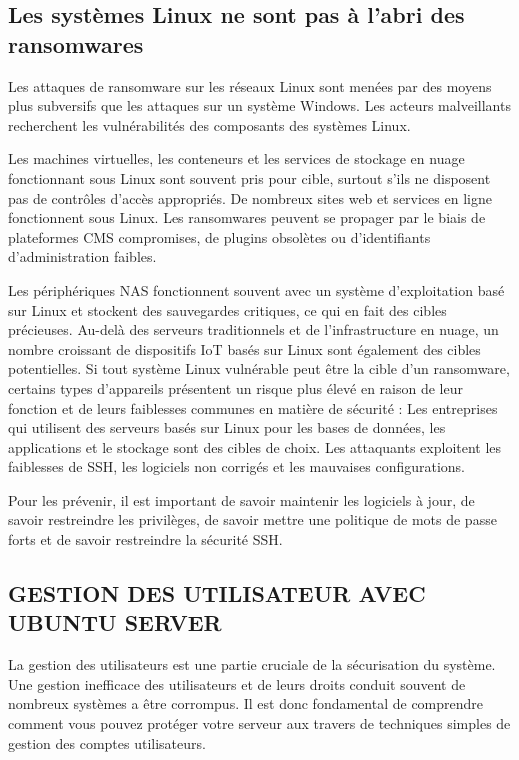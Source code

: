\subsection*{Les systèmes Linux ne sont pas à l'abri des ransomwares}
{}
\noindent Les attaques de ransomware sur les réseaux Linux sont menées par des moyens plus subversifs que les
attaques sur un système Windows. Les acteurs malveillants recherchent les vulnérabilités des
composants des systèmes Linux.

\noindent Les machines virtuelles, les conteneurs et les services de stockage en nuage fonctionnant sous Linux
sont souvent pris pour cible, surtout s'ils ne disposent pas de contrôles d'accès appropriés.
De nombreux sites web et services en ligne fonctionnent sous Linux. Les ransomwares peuvent se
propager par le biais de plateformes CMS compromises, de plugins obsolètes ou d'identifiants
d'administration faibles.

\noindent  Les périphériques NAS fonctionnent souvent avec un système d'exploitation basé sur Linux et stockent
des sauvegardes critiques, ce qui en fait des cibles précieuses.
Au-delà des serveurs traditionnels et de l'infrastructure en nuage, un nombre croissant de dispositifs IoT
basés sur Linux sont également des cibles potentielles.
Si tout système Linux vulnérable peut être la cible d'un ransomware, certains types d'appareils
présentent un risque plus élevé en raison de leur fonction et de leurs faiblesses communes en matière
de sécurité :
\noindent Les entreprises qui utilisent des serveurs basés sur Linux pour les bases de données, les applications et
le stockage sont des cibles de choix. Les attaquants exploitent les faiblesses de SSH, les logiciels non
corrigés et les mauvaises configurations.

\noindent Pour les prévenir, il est important de savoir maintenir les logiciels à jour, de savoir restreindre les
privilèges, de savoir mettre une politique de mots de passe forts et de savoir restreindre la sécurité SSH.

\subsection*{GESTION DES UTILISATEUR AVEC UBUNTU SERVER}
{}
\noindent La gestion des utilisateurs est une partie cruciale de la sécurisation du système. Une gestion inefficace des utilisateurs et de leurs droits conduit souvent de nombreux systèmes a être corrompus. Il est donc fondamental de comprendre comment vous pouvez protéger votre serveur aux travers de techniques simples de gestion des comptes utilisateurs.

